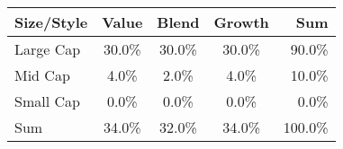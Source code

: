 \center
\begin{tabular}{l|c c c|r}
Size/Style & Value & Blend & Growth & Sum \\\hline\hline
Large Cap & 30.0\% & 30.0\% & 30.0\% & 90.0\% \\
Mid Cap & 4.0\% & 2.0\% & 4.0\% & 10.0\% \\
Small Cap & 0.0\% & 0.0\% & 0.0\% & 0.0\% \\\hline
Sum & 34.0\% & 32.0\% & 34.0\% & 100.0\% \\
\end{tabular}
